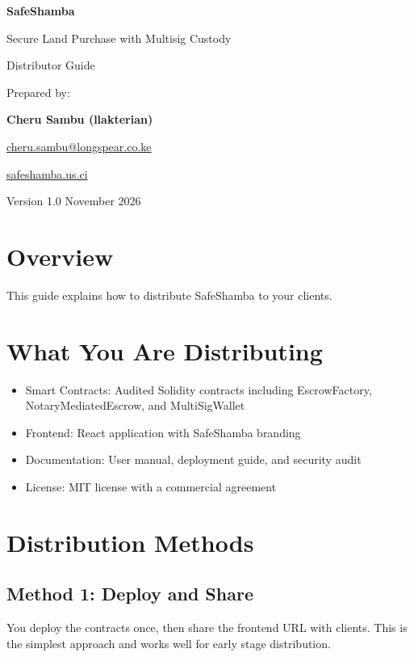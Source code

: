 \documentclass[11pt]{article}
\begin{document}
\begin{titlepage}
\centering
\vspace*{3cm}
{\Huge\bfseries\color{sambagreen} SafeShamba\par}
\vspace{0.5cm}
{\Large\color{sambagray} Secure Land Purchase with Multisig Custody\par}
\vspace{3cm}
{\LARGE Distributor Guide\par}
\vspace{4cm}
{\large Prepared by:\par}
\vspace{0.3cm}
{\large\bfseries Cheru Sambu (llakterian)\par}
{\large \href{mailto:cheru.sambu@longspear.co.ke}{cheru.sambu@longspear.co.ke}\par}
{\large \href{https://safeshamba.us.ci}{safeshamba.us.ci}\par}
\vspace{2cm}
{\large Version 1.0 \textbar{} November 2026\par}
\end{titlepage}

\newpage
\tableofcontents
\newpage

\section{Overview}
This guide explains how to distribute SafeShamba to your clients.

\section{What You Are Distributing}
\begin{itemize}
\item Smart Contracts: Audited Solidity contracts including EscrowFactory, NotaryMediatedEscrow, and MultiSigWallet
\item Frontend: React application with SafeShamba branding
\item Documentation: User manual, deployment guide, and security audit
\item License: MIT license with a commercial agreement
\end{itemize}

\section{Distribution Methods}
\subsection{Method 1: Deploy and Share}
You deploy the contracts once, then share the frontend URL with clients. This is the simplest approach and works well for early stage distribution.
\end{document}
